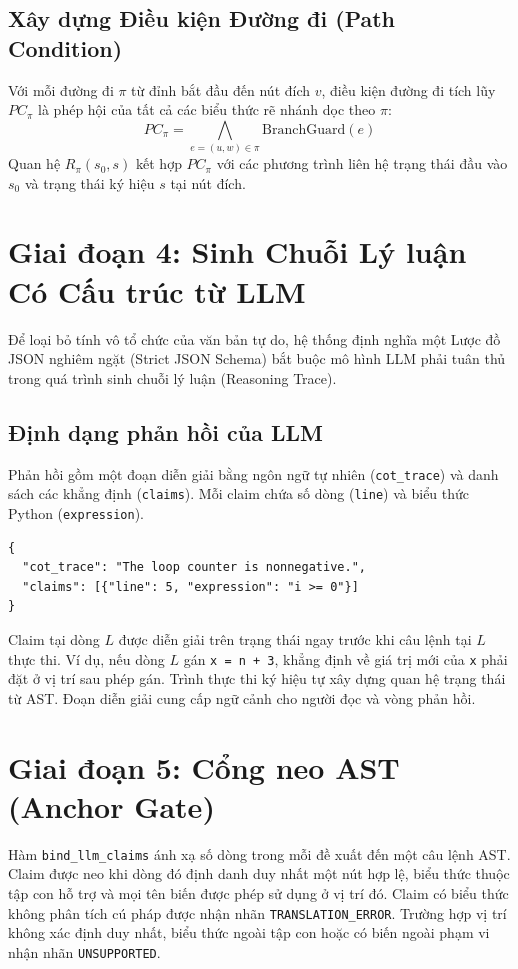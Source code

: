 \subsection{Xây dựng Điều kiện Đường đi (Path Condition)}
Với mỗi đường đi $\pi$ từ đỉnh bắt đầu đến nút đích $v$, điều kiện đường đi tích lũy $PC_{\pi}$ là phép hội của tất cả các biểu thức rẽ nhánh dọc theo $\pi$:
\begin{equation}
PC_{\pi} = \bigwedge_{e = (u, w) \in \pi} \text{BranchGuard}(e)
\end{equation}
Quan hệ $R_\pi(s_0,s)$ kết hợp $PC_\pi$ với các phương trình liên hệ trạng thái đầu vào $s_0$ và trạng thái ký hiệu $s$ tại nút đích.

\section{Giai đoạn 4: Sinh Chuỗi Lý luận Có Cấu trúc từ LLM}
\label{sec:llm_structured_cot}

Để loại bỏ tính vô tổ chức của văn bản tự do, hệ thống định nghĩa một Lược đồ JSON nghiêm ngặt (Strict JSON Schema) bắt buộc mô hình LLM phải tuân thủ trong quá trình sinh chuỗi lý luận (Reasoning Trace).

\subsection{Định dạng phản hồi của LLM}
Phản hồi gồm một đoạn diễn giải bằng ngôn ngữ tự nhiên (\texttt{cot\_trace}) và danh sách các khẳng định (\texttt{claims}). Mỗi claim chứa số dòng (\texttt{line}) và biểu thức Python (\texttt{expression}).
\begin{lstlisting}[caption={Ví dụ về phản hồi JSON của LLM}]
{
  "cot_trace": "The loop counter is nonnegative.",
  "claims": [{"line": 5, "expression": "i >= 0"}]
}
\end{lstlisting}
Claim tại dòng $L$ được diễn giải trên trạng thái ngay trước khi câu lệnh tại $L$ thực thi. Ví dụ, nếu dòng $L$ gán \texttt{x = n + 3}, khẳng định về giá trị mới của \texttt{x} phải đặt ở vị trí sau phép gán. Trình thực thi ký hiệu tự xây dựng quan hệ trạng thái từ AST. Đoạn diễn giải cung cấp ngữ cảnh cho người đọc và vòng phản hồi.

\section{Giai đoạn 5: Cổng neo AST (Anchor Gate)}
\label{sec:anchor_gate}

Hàm \texttt{bind\_llm\_claims} ánh xạ số dòng trong mỗi đề xuất đến một câu lệnh AST. Claim được neo khi dòng đó định danh duy nhất một nút hợp lệ, biểu thức thuộc tập con hỗ trợ và mọi tên biến được phép sử dụng ở vị trí đó. Claim có biểu thức không phân tích cú pháp được nhận nhãn \texttt{TRANSLATION\_ERROR}. Trường hợp vị trí không xác định duy nhất, biểu thức ngoài tập con hoặc có biến ngoài phạm vi nhận nhãn \texttt{UNSUPPORTED}.

